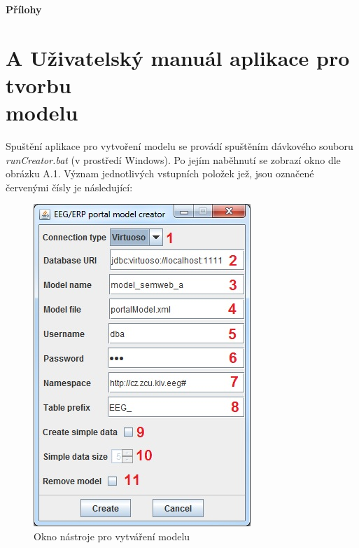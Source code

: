 \documentclass{projekt}
\begin{document}




\appendix
\newpage


\thispagestyle{plain}

\noindent
{\bf \LARGE Přílohy}
\setcounter{chapter}{1}

\newpage
\thispagestyle{plain}
\section*{{\LARGE A} Uživatelský manuál aplikace pro tvorbu \\modelu}
\hspace{0.65cm}Spuštění aplikace pro vytvoření modelu se provádí spuštěním dávkového souboru {\it runCreator.bat} (v prostředí Windows). Po jejím naběhnutí se zobrazí okno dle obrázku A.1. Význam jednotlivých vstupních položek jež, jsou označené červenými čísly je následující:

\begin{figure}[htb!]
\begin{center}
\includegraphics[scale=0.8]{manualCreator.jpg}
\caption{Okno nástroje pro vytváření modelu}
\end{center}
\end{figure}
\end{document}
